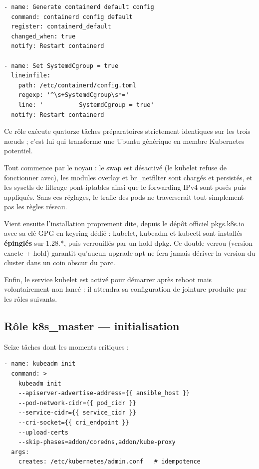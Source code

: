 \documentclass[12pt,a4paper,twoside,openright]{report}
\begin{document}
\begin{lstlisting}[caption={Bascule cruciale : pilote cgroup systemd pour containerd}]
- name: Generate containerd default config
  command: containerd config default
  register: containerd_default
  changed_when: true
  notify: Restart containerd

- name: Set SystemdCgroup = true
  lineinfile:
    path: /etc/containerd/config.toml
    regexp: '^\s+SystemdCgroup\s*='
    line: '          SystemdCgroup = true'
  notify: Restart containerd
\end{lstlisting}

Ce rôle exécute quatorze tâches préparatoires strictement identiques sur les trois nœuds ; c'est lui qui transforme une Ubuntu générique en membre Kubernetes potentiel.

Tout commence par le noyau : le swap est désactivé (le kubelet refuse de fonctionner avec), les modules overlay et br\_netfilter sont chargés et persistés, et les sysctls de filtrage pont-iptables ainsi que le forwarding IPv4 sont posés puis appliqués. Sans ces réglages, le trafic des pods ne traverserait tout simplement pas les règles réseau.

Vient ensuite l'installation proprement dite, depuis le dépôt officiel pkgs.k8s.io avec sa clé GPG en keyring dédié : kubelet, kubeadm et kubectl sont installés \textbf{épinglés} sur 1.28.*, puis verrouillés par un hold dpkg. Ce double verrou (version exacte + hold) garantit qu'aucun upgrade apt ne fera jamais dériver la version du cluster dans un coin obscur du parc.

Enfin, le service kubelet est activé pour démarrer après reboot mais volontairement non lancé : il attendra sa configuration de jointure produite par les rôles suivants.

\subsection{Rôle k8s\_master --- initialisation}
Seize tâches dont les moments critiques :

\begin{lstlisting}[caption={kubeadm init : addons différés pour éviter les CrashLoop initiaux}]
- name: kubeadm init
  command: >
    kubeadm init
    --apiserver-advertise-address={{ ansible_host }}
    --pod-network-cidr={{ pod_cidr }}
    --service-cidr={{ service_cidr }}
    --cri-socket={{ cri_endpoint }}
    --upload-certs
    --skip-phases=addon/coredns,addon/kube-proxy
  args:
    creates: /etc/kubernetes/admin.conf   # idempotence
\end{lstlisting}
\end{document}
